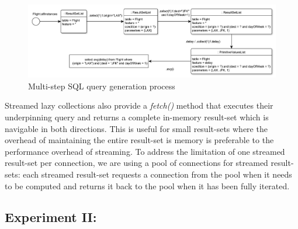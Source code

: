 \begin{figure}
 \centering
		\includegraphics[width=\textwidth]{images/query.pdf}
	\caption{Multi-step SQL query generation process}
	\label{fig:query}
\end{figure}

Streamed lazy collections also provide a \emph{fetch()} method that executes their underpinning query and returns a complete in-memory result-set which is navigable in both directions. This is useful for small result-sets where the overhead of maintaining the entire result-set is memory is preferable to the performance overhead of streaming. To address the limitation of one streamed result-set per connection, we are using a pool of connections for streamed result-sets: each streamed result-set requests a connection from the pool when it needs to be computed and returns it back to the pool when it has been fully iterated.

\subsection{Experiment II:}




